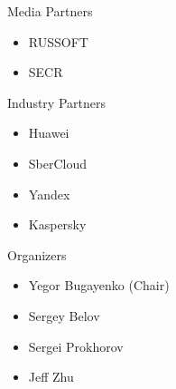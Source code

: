 \documentclass[12pt,twosides]{book}
\begin{document}
\begin{multicols}{2}
Media Partners

\begin{itemize}
\item RUSSOFT
\item SECR
\end{itemize}

Industry Partners

\begin{itemize}
\item Huawei
\item SberCloud
\item Yandex
\item Kaspersky
\end{itemize}

Organizers

\begin{itemize}
\item Yegor Bugayenko (Chair)
\item Sergey Belov
\item Sergei Prokhorov
\item Jeff Zhu
\end{itemize}
\end{multicols}



\end{document}
